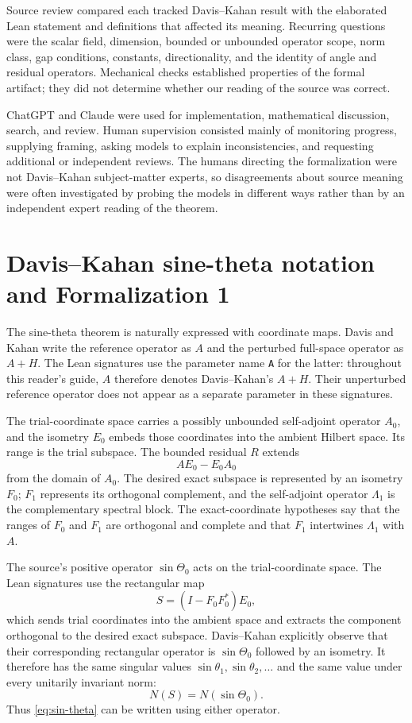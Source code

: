 Source review compared each tracked Davis--Kahan result with the elaborated Lean
statement and definitions that affected its meaning.  Recurring questions were
the scalar field, dimension, bounded or unbounded operator scope, norm class,
gap conditions, constants, directionality, and the identity of angle and
residual operators.  Mechanical checks established properties of the formal
artifact; they did not determine whether our reading of the source was correct.

ChatGPT and Claude were used for implementation, mathematical discussion,
search, and review.  Human supervision consisted mainly of monitoring progress,
supplying framing, asking models to explain inconsistencies, and requesting
additional or independent reviews.  The humans directing the formalization were
not Davis--Kahan subject-matter experts, so disagreements about source meaning
were often investigated by probing the models in different ways rather than by
an independent expert reading of the theorem.

\section{Davis--Kahan sine-theta notation and Formalization 1}
\label{app:formalization1}

The sine-theta theorem is naturally expressed with coordinate maps.  Davis and
Kahan write the reference operator as $A$ and the perturbed full-space operator
as $A+H$.  The Lean signatures use the parameter name \texttt{A} for the latter:
throughout this reader's guide, $A$ therefore denotes Davis--Kahan's $A+H$.
Their unperturbed reference operator does not appear as a separate parameter in
these signatures.

The trial-coordinate space carries a possibly unbounded self-adjoint operator
$A_0$, and the isometry $E_0$ embeds those coordinates into the ambient Hilbert
space.  Its range is the trial subspace.  The bounded residual $R$ extends
\[
  AE_0-E_0A_0
\]
from the domain of $A_0$.  The desired exact subspace is represented by an
isometry $F_0$; $F_1$ represents its orthogonal complement, and the
self-adjoint operator $\Lambda_1$ is the complementary spectral block.  The
exact-coordinate hypotheses say that the ranges of $F_0$ and $F_1$ are
orthogonal and complete and that $F_1$ intertwines $\Lambda_1$ with $A$.

The source's positive operator $\sin\Theta_0$ acts on the trial-coordinate
space.  The Lean signatures use the rectangular map
\[
  S=(I-F_0F_0^*)E_0,
\]
which sends trial coordinates into the ambient space and extracts the component
orthogonal to the desired exact subspace.  Davis--Kahan explicitly observe that
their corresponding rectangular operator is $\sin\Theta_0$ followed by an
isometry.  It therefore has the same singular values
$\sin\theta_1,\sin\theta_2,\ldots$ and the same value under every unitarily
invariant norm:
\[
  N(S)=N(\sin\Theta_0).
\]
Thus \cref{eq:sin-theta} can be written using either operator.

